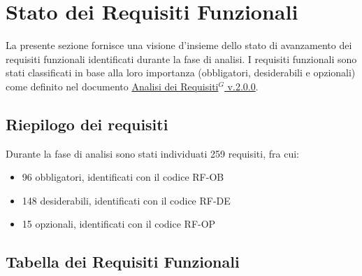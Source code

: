 \section{Stato dei Requisiti Funzionali}
La presente sezione fornisce una visione d’insieme dello stato di avanzamento dei requisiti funzionali identificati durante la fase di analisi. I requisiti funzionali sono stati classificati in base alla loro importanza (obbligatori, desiderabili e opzionali) come definito nel documento \href{https://nullpointersgroup.github.io/Documentazione/output/PB/Documenti%20Esterni/Analisi_dei_Requisiti.pdf}{Analisi dei Requisiti$^G$ v.2.0.0}.

\subsection{Riepilogo dei requisiti}
Durante la fase di analisi sono stati individuati 259 requisiti, fra cui:
\begin{itemize}
	\item 96 obbligatori, identificati con il codice RF-OB
	\item 148 desiderabili, identificati con il codice RF-DE
	\item 15 opzionali, identificati con il codice RF-OP
\end{itemize}

\subsection{Tabella dei Requisiti Funzionali}

